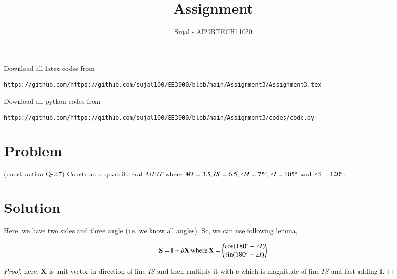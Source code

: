 \documentclass[journal,12pt,twocolumn]{IEEEtran}
\begin{document}
\let\StandardTheFigure\thefigure
\let\vec\mathbf
\renewcommand{\thefigure}{\theproblem}
\def\putbox#1#2#3{\makebox[0in][l]{\makebox[#1][l]{}\raisebox{\baselineskip}[0in][0in]{\raisebox{#2}[0in][0in]{#3}}}}
     \def\rightbox#1{\makebox[0in][r]{#1}}
     \def\centbox#1{\makebox[0in]{#1}}
     \def\topbox#1{\raisebox{-\baselineskip}[0in][0in]{#1}}
     \def\midbox#1{\raisebox{-0.5\baselineskip}[0in][0in]{#1}}
\vspace{3cm}
\title{Assignment }
\author{Sujal - AI20BTECH11020}
\maketitle
\newpage
\bigskip
\renewcommand{\thefigure}{\theenumi}
\renewcommand{\thetable}{\theenumi}
Download all latex codes from 

\begin{lstlisting}
https://github.com/https://github.com/sujal100/EE3900/blob/main/Assignment3/Assignment3.tex
\end{lstlisting}

Download all python codes from 

\begin{lstlisting}
https://github.com/https://github.com/sujal100/EE3900/blob/main/Assignment3/codes/code.py
\end{lstlisting}
\section{Problem}
(construction Q-2.7) Construct a quadrilateral $MIST$ where $MI = 3.5, IS = 6.5, \angle M = 75 \degree , \angle I = 105 \degree$ and $ \angle S = 120 \degree$.
\section{Solution}
Here, we have two sides and three angle (i.e. we know all angles). So, we can use following lemma,
\begin{lemma}
\label{lemma a}
\begin{align}
\vec{S} =\vec{I} + b\vec{X} \text{ where } \vec{X} = \myvec{\cos (180\degree -\angle I)\\\sin (180\degree -\angle I)} \label{eq b}
\end{align}
\end{lemma}
\begin{proof}
here, $\vec{X}$ is unit vector in direction of line $IS$ and then multiply it with $b$ which is magnitude of line $IS$ and last adding $\vec{I}$.
\end{proof}
\end{document}
